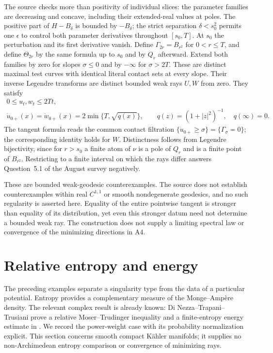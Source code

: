 The source checks more than positivity of individual slices:
the parameter families are decreasing and concave, including
their extended-real values at poles. The positive part of
$H-B_\delta$ is bounded by $-B_\delta$; the strict separation
$\delta<s_0^2$ permits one $\epsilon$ to control both
parameter derivatives throughout $[s_0,T]$.
At $s_0$ the perturbation and its first derivative vanish.
Define $\Gamma_{2r}=B_{r^2}$ for $0<r\leq T$, and define
$\Theta_{2r}$ by the same formula up to $s_0$ and by $Q_r$
afterward. Extend both families by zero for slopes $\sigma\leq0$
and by $-\infty$ for $\sigma>2T$.
These are distinct maximal test curves with identical literal
contact sets at every slope. Their inverse Legendre transforms
are distinct bounded weak rays $U,W$ from zero. They satisfy
\[
\tag{65.65}\label{eq:rf-survey-same-initial-tangent}
 \begin{gathered}
 0\leq u_t,w_t\leq2Tt,\\
 \dot u_{0+}(x)=\dot w_{0+}(x)
      =2\min\{T,\sqrt{q(x)}\},\qquad
 q(z)=(1+|z|^2)^{-1},\quad q(\infty)=0.
 \end{gathered}
\]
The tangent formula reads the common contact filtration
$\{\dot u_{0+}\geq\sigma\}=\{\Gamma_\sigma=0\}$;
the corresponding identity holds for $W$.
Distinctness follows from Legendre bijectivity, since for
$r>s_0$ a finite atom of $\nu$ is a pole of $Q_r$ and
is a finite point of $B_{r^2}$.
Restricting to a finite interval on which the rays differ
answers Question~5.1 of the August survey negatively.

These are bounded weak-geodesic counterexamples. The source
does not establish counterexamples within real $C^{1,1}$ or
smooth nondegenerate geodesics, and no such regularity is
asserted here. Equality of the entire pointwise tangent is
stronger than equality of its distribution, yet even this
stronger datum need not determine a bounded weak ray.
The construction does not supply a limiting spectral law or
convergence of the minimizing directions in A4.

\clearpage

\section{Relative entropy and energy}
\label{sec:rf-relative-entropy-energy}

The preceding examples separate a singularity type from the data of a
particular potential. Entropy provides a complementary measure of the
Monge--Amp\`ere density. The relevant complex result is already known:
Di Nezza--Trapani--Trusiani prove a relative Moser--Trudinger inequality
and a finite-entropy energy estimate in
\cite[Theorems~3.5 and~3.7]{DNTT24EntropyPublished}. We record the
power-weight case with its probability normalization explicit. This
section concerns smooth compact K\"ahler manifolds; it supplies no
non-Archimedean entropy comparison or convergence of minimizing rays.

